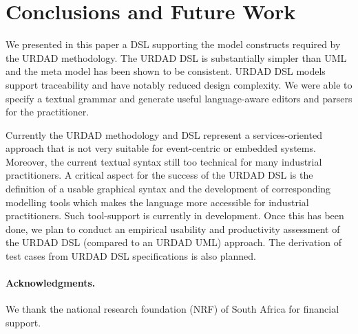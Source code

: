 \section{Conclusions and Future Work \label{sec:conclusionsAndOutlook}}

We presented in this paper a DSL supporting the model 
constructs required by the URDAD methodology. The URDAD 
DSL is substantially simpler than UML and the meta model 
has been shown to be consistent. URDAD DSL models support 
traceability and have notably reduced design complexity. 
We were able to specify a textual grammar and generate 
useful language-aware editors and parsers for the
practitioner.

Currently the URDAD methodology and DSL represent a 
services-oriented approach that is not very suitable 
for event-centric or embedded systems. Moreover, the 
current textual syntax still too technical for many
industrial practitioners. A critical aspect for the 
success of the URDAD DSL is the definition of a usable 
graphical syntax and the development of corresponding 
modelling tools which makes the language more accessible
for industrial practitioners. Such tool-support is 
currently in development. Once this has been done, 
we plan to conduct an empirical usability and productivity 
assessment of the URDAD DSL (compared to an URDAD UML) 
approach. The derivation of test cases from URDAD DSL
specifications is also planned.

\paragraph{Acknowledgments.} We thank the national research 
foundation (NRF) of South Africa for financial support.

